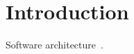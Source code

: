 \chapter{Introduction}
\label{chap:intro}

Software architecture~\citep{lazypropagation2010,ambiguity2010}. \lipsum[2-10]
